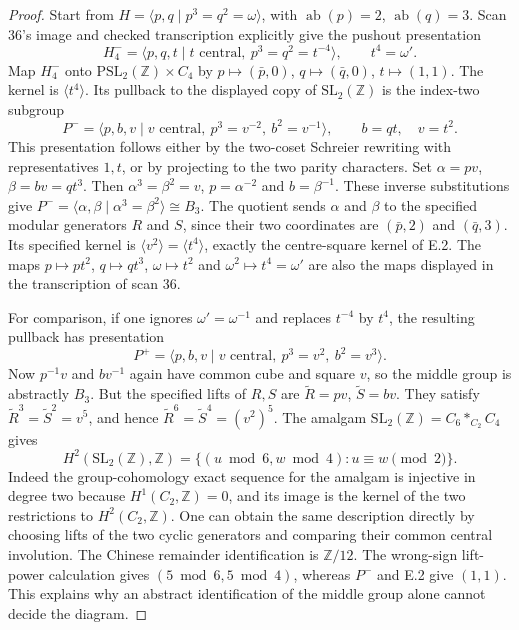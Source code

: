 \begin{proof}
Start from $H=\langle p,q\mid p^3=q^2=\omega\rangle$, with
$\operatorname{ab}(p)=2$, $\operatorname{ab}(q)=3$.  Scan 36's
image and checked transcription explicitly give the pushout presentation
\[
 H_4^-=\langle p,q,t\mid t\text{ central},\ p^3=q^2=t^{-4}\rangle,
 \qquad t^4=\omega'.
\]
Map $H_4^-$ onto $\mathrm{PSL}_2(\mathbb Z)\times C_4$ by
$p\mapsto(\bar p,0)$, $q\mapsto(\bar q,0)$, $t\mapsto(1,1)$.
The kernel is $\langle t^4\rangle$.  Its pullback to the displayed
copy of $\mathrm{SL}_2(\mathbb Z)$ is the index-two subgroup
\[
 P^-=\langle p,b,v\mid v\text{ central},\ p^3=v^{-2},\ b^2=v^{-1}\rangle,
 \qquad b=qt,\quad v=t^2.
\]
This presentation follows either by the two-coset Schreier rewriting
with representatives $1,t$, or by projecting to the two parity
characters.  Set $\alpha=pv$, $\beta=bv=qt^3$.  Then
$\alpha^3=\beta^2=v$, $p=\alpha^{-2}$ and $b=\beta^{-1}$.
These inverse substitutions give
$P^-=\langle\alpha,\beta\mid\alpha^3=\beta^2\rangle\cong B_3$.
The quotient sends $\alpha$ and $\beta$ to the specified modular
generators $R$ and $S$, since their two coordinates are
$(\bar p,2)$ and $(\bar q,3)$.  Its specified kernel is
$\langle v^2\rangle=\langle t^4\rangle$, exactly the centre-square
kernel of E.2.  The maps $p\mapsto pt^2$, $q\mapsto qt^3$,
$\omega\mapsto t^2$ and $\omega^2\mapsto t^4=\omega'$ are also
the maps displayed in the transcription of scan 36.

For comparison, if one ignores $\omega'=\omega^{-1}$ and replaces
$t^{-4}$ by $t^4$, the resulting pullback has presentation
\[
 P^+=\langle p,b,v\mid v\text{ central},\ p^3=v^2,\ b^2=v^3\rangle.
\]
Now $p^{-1}v$ and $bv^{-1}$ again have common cube and square $v$,
so the middle group is abstractly $B_3$.  But the specified lifts
of $R,S$ are
$\widetilde R=pv$, $\widetilde S=bv$.  They satisfy
$\widetilde R^3=\widetilde S^2=v^5$, and hence
$\widetilde R^6=\widetilde S^4=(v^2)^5$.
The amalgam $\mathrm{SL}_2(\mathbb Z)=C_6*_{C_2}C_4$ gives
\[
 H^2(\mathrm{SL}_2(\mathbb Z),\mathbb Z)
 =\{(u\bmod6,w\bmod4):u\equiv w\pmod2\}.
\]
Indeed the group-cohomology exact sequence for the amalgam is
injective in degree two because $H^1(C_2,\mathbb Z)=0$, and its image
is the kernel of the two restrictions to $H^2(C_2,\mathbb Z)$.
One can obtain the same description directly by choosing lifts of
the two cyclic generators and comparing their common central
involution.  The Chinese remainder identification is $\mathbb Z/12$.
The wrong-sign lift-power calculation gives
$(5\bmod6,5\bmod4)$, whereas $P^-$ and E.2 give $(1,1)$.
This explains why an abstract identification of the middle group
alone cannot decide the diagram.


\end{proof}
